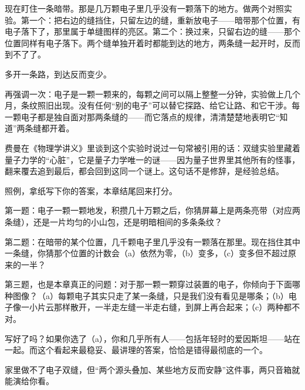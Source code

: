 现在盯住一条暗带。那是几万颗电子里几乎没有一颗落下的地方。做两个对照实验。第一个：把右边的缝挡住，只留左边的缝，重新放电子——暗带那个位置，有电子落下了，那里属于单缝图样的亮区。第二个：换过来，只留右边的缝——那个位置同样有电子落下。两个缝单独开着时都能到达的地方，两条缝一起开时，反而到不了了。

多开一条路，到达反而变少。

再强调一次：电子是一颗一颗来的，每颗之间可以隔上整整一分钟，实验做上几个月，条纹照旧出现。没有任何“别的电子”可以替它探路、给它让路、和它干涉。每一颗电子都是独自面对那两条缝的——而它落点的规律，清清楚楚地表明它“知道”两条缝都开着。

费曼在《物理学讲义》里谈到这个实验时说过一句常被引用的话：双缝实验里藏着量子力学的“心脏”，它是量子力学唯一的谜——因为量子世界里其他所有的怪事，翻来覆去追到最后，都会回到这同一个谜上。这句话不是修辞，是经验总结。


照例，拿纸写下你的答案，本章结尾回来打分。

第一题：电子一颗一颗地发，积攒几十万颗之后，你猜屏幕上是两条亮带（对应两条缝），还是一片均匀的小山包，还是明暗相间的多条条纹？

第二题：在暗带的某个位置，几千颗电子里几乎没有一颗落在那里。现在挡住其中一条缝，你猜那个位置的计数会（a）依然为零，（b）变多，（c）变多但不超过原来的一半？

第三题，也是本章真正的问题：对于那一颗一颗穿过装置的电子，你倾向于下面哪种图像？（a）每颗电子其实只走了某一条缝，只是我们没有看见是哪条；（b）电子像一小片云那样散开，一半走左缝一半走右缝，到屏上再合起来；（c）两种都不对。

写好了吗？如果你选了（a），你和几乎所有人——包括年轻时的爱因斯坦——站在一起。而这个看起来最稳妥、最讲理的答案，恰恰是错得最彻底的一个。


家里做不了电子双缝，但“两个源头叠加、某些地方反而安静”这件事，两只音箱就能演给你看。

